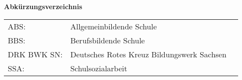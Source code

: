 \textbf{Abkürzungsverzeichnis}\\[1cm]


\begin{tabular}{lll}
ABS: & Allgemeinbildende Schule\\[0,5cm]
BBS: & Berufsbildende Schule\\[0,5cm]
DRK BWK SN: & Deutsches Rotes Kreuz Bildungswerk Sachsen\\[0,5cm]
SSA: & Schulsozialarbeit\\
\end{tabular}
